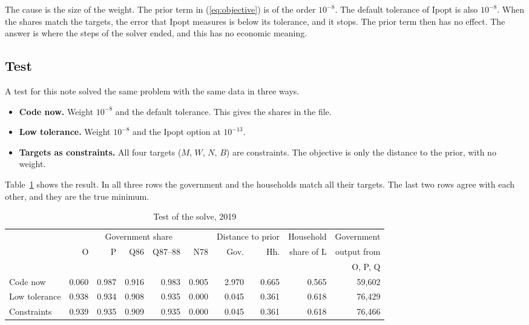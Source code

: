 \documentclass[11pt,a4paper]{article}
\newcommand{\code}[1]{\texttt{\detokenize{#1}}}
\begin{document}
The cause is the size of the weight. The prior term in (\ref{eq:objective}) is of the order $10^{-8}$.
The default tolerance of Ipopt is also $10^{-8}$. When the shares match the targets, the error that Ipopt measures is below its tolerance, and it stops.
The prior term then has no effect. The answer is where the steps of the solver ended, and this has no economic meaning.

\subsection{Test}

A test for this note solved the same problem with the same data in three ways.
\begin{itemize}
\item \textbf{Code now.} Weight $10^{-8}$ and the default tolerance. This gives the shares in the file.
\item \textbf{Low tolerance.} Weight $10^{-8}$ and the Ipopt option \code{tol} at $10^{-13}$.
\item \textbf{Targets as constraints.} All four targets ($M$, $W$, $N$, $B$) are constraints. The objective is only the distance to the prior, with no weight.
\end{itemize}
Table~\ref{tab:test} shows the result. In all three rows the government and the households match all their targets.
The last two rows agree with each other, and they are the true minimum.

\begin{table}[!htbp]
\centering
\small
\caption{Test of the solve, 2019}
\label{tab:test}
\setlength{\tabcolsep}{4.5pt}
\begin{tabular}{@{}lrrrrrrrrr@{}}
\toprule
 & \multicolumn{5}{c}{Government share} & \multicolumn{2}{c}{Distance to prior} & Household & Government \\
\cmidrule(lr){2-6}\cmidrule(lr){7-8}
 & O & P & Q86 & Q87--88 & N78 & Gov. & Hh. & share of L & output from \\
 & & & & & & & & & O, P, Q \\
\midrule
Code now & 0.060 & 0.987 & 0.916 & 0.983 & 0.905 & 2.970 & 0.665 & 0.565 & 59,602 \\
Low tolerance & 0.938 & 0.934 & 0.908 & 0.935 & 0.000 & 0.045 & 0.361 & 0.618 & 76,429 \\
Constraints & 0.939 & 0.935 & 0.909 & 0.935 & 0.000 & 0.045 & 0.361 & 0.618 & 76,466 \\
\bottomrule
\end{tabular}
\end{table}
\end{document}
